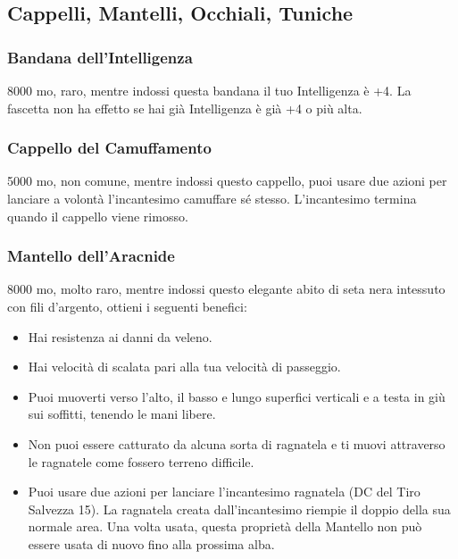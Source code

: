 \begin{multicols}{2}
	\subsection{Cappelli, Mantelli, Occhiali, Tuniche}


	\subsubsection*{Bandana dell'Intelligenza}
	8000 mo, raro, mentre indossi questa bandana il tuo Intelligenza è +4. La fascetta non ha effetto se hai già Intelligenza è già +4 o più alta.

	\subsubsection*{Cappello del Camuffamento}
	5000 mo, non comune, mentre indossi questo cappello, puoi usare due azioni per lanciare a volontà l'incantesimo camuffare sé stesso. L'incantesimo termina quando il cappello viene rimosso.

	\subsubsection*{Mantello dell'Aracnide}
	8000 mo, molto raro, mentre indossi questo elegante abito di seta nera intessuto con fili d'argento, ottieni i seguenti benefici:

	\medskip

	\begin{itemize}
		\item
		Hai resistenza ai danni da veleno.
		\item
		Hai velocità di scalata pari alla tua velocità di passeggio.
		\item
		Puoi muoverti verso l'alto, il basso e lungo superfici verticali e a testa in giù sui soffitti, tenendo le mani libere.
		\item
		Non puoi essere catturato da alcuna sorta di ragnatela e ti muovi attraverso le ragnatele come fossero terreno difficile.
		\item
		Puoi usare due azioni per lanciare l'incantesimo ragnatela (DC del Tiro Salvezza 15). La ragnatela creata dall'incantesimo riempie il doppio della sua normale area. Una volta usata, questa proprietà della Mantello non può essere usata di nuovo fino alla prossima alba.
	\end{itemize}


\end{multicols}
